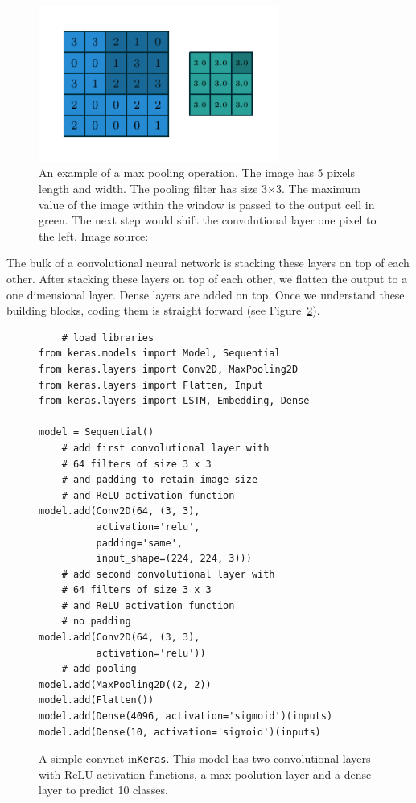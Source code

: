 \documentclass[12pt, a4paper, oneside, headinclude, footinclude]{article}
\begin{document}
\begin{figure}
	\centering
    \includegraphics[width=0.7\textwidth]{numerical_max_pooling_02.pdf}
    \caption[A max pooling operation] {An example of a max pooling operation.
    The image has 5 pixels length and width. The pooling filter has size
    3$\times$3. The maximum value of the image within the window is passed to
    the output cell in green. The next step would shift the convolutional
    layer one pixel to the left. Image source: ~\cite{dumoulin2016guide}
    \label{fig:maxpooling}}
\end{figure}

The bulk of a convolutional neural network is stacking these layers on top of
each other. After stacking these layers on top of each other, we flatten the
output to a one dimensional layer. Dense layers are added on top. Once we
understand these building blocks, coding them is straight forward (see
Figure~\ref{alg:simple_convnet}).

\begin{figure}
\begin{verbatim}
    # load libraries
from keras.models import Model, Sequential
from keras.layers import Conv2D, MaxPooling2D
from keras.layers import Flatten, Input
from keras.layers import LSTM, Embedding, Dense

model = Sequential()
    # add first convolutional layer with 
    # 64 filters of size 3 x 3
    # and padding to retain image size
    # and ReLU activation function
model.add(Conv2D(64, (3, 3), 
          activation='relu', 
          padding='same', 
          input_shape=(224, 224, 3)))
    # add second convolutional layer with 
    # 64 filters of size 3 x 3
    # and ReLU activation function
    # no padding
model.add(Conv2D(64, (3, 3), 
          activation='relu'))
    # add pooling
model.add(MaxPooling2D((2, 2))
model.add(Flatten())
model.add(Dense(4096, activation='sigmoid')(inputs)
model.add(Dense(10, activation='sigmoid')(inputs)

\end{verbatim}
    \caption[A simple convnet in\texttt{Keras}]{A simple convnet in\texttt{Keras}. This model
    has two convolutional layers with ReLU activation functions, a max
    poolution layer and a dense layer to predict 10
    classes.\label{alg:simple_convnet}}
\end{figure}
\end{document}
